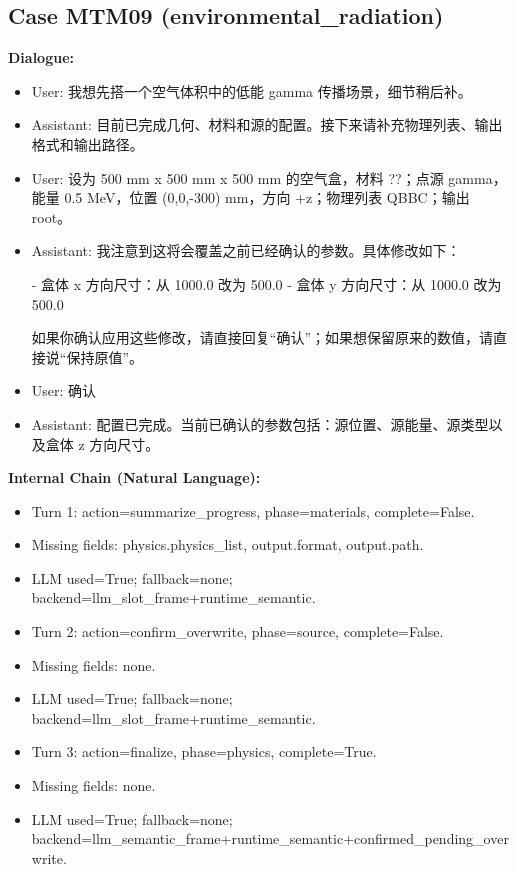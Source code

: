 \documentclass[11pt]{ctexart}
\begin{document}
\subsection{Case MTM09 (environmental\_radiation)}
\textbf{Dialogue:}
\begin{itemize}
\item User: 我想先搭一个空气体积中的低能 gamma 传播场景，细节稍后补。
\item Assistant: 目前已完成几何、材料和源的配置。接下来请补充物理列表、输出格式和输出路径。
\item User: 设为 500 mm x 500 mm x 500 mm 的空气盒，材料 ??；点源 gamma，能量 0.5 MeV，位置 (0,0,-300) mm，方向 +z；物理列表 QBBC；输出 root。
\item Assistant: 我注意到这将会覆盖之前已经确认的参数。具体修改如下：

- 盒体 x 方向尺寸：从 1000.0 改为 500.0
- 盒体 y 方向尺寸：从 1000.0 改为 500.0

如果你确认应用这些修改，请直接回复“确认”；如果想保留原来的数值，请直接说“保持原值”。
\item User: 确认
\item Assistant: 配置已完成。当前已确认的参数包括：源位置、源能量、源类型以及盒体 z 方向尺寸。
\end{itemize}
\textbf{Internal Chain (Natural Language):}
\begin{itemize}
\item Turn 1: action=summarize\_progress, phase=materials, complete=False.
\item Missing fields: physics.physics\_list, output.format, output.path.
\item LLM used=True; fallback=none; backend=llm\_slot\_frame+runtime\_semantic.
\item Turn 2: action=confirm\_overwrite, phase=source, complete=False.
\item Missing fields: none.
\item LLM used=True; fallback=none; backend=llm\_slot\_frame+runtime\_semantic.
\item Turn 3: action=finalize, phase=physics, complete=True.
\item Missing fields: none.
\item LLM used=True; fallback=none; backend=llm\_semantic\_frame+runtime\_semantic+confirmed\_pending\_overwrite.
\end{itemize}
\end{document}
